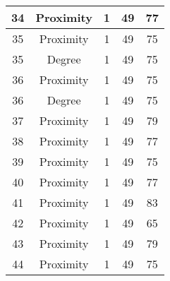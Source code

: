 \documentclass[results.tex]{subfiles}
\begin{document}
\begin{center}
\begin{tabular}{| c || c | c | c | c |}
            \hline
            34                      & Proximity                    & 1                      & 49                      & 77                   \\
            \hline
            35                      & Proximity                    & 1                      & 49                      & 75                   \\
            \hline
            35                      & Degree                       & 1                      & 49                      & 75                   \\
            \hline
            36                      & Proximity                    & 1                      & 49                      & 75                   \\
            \hline
            36                      & Degree                       & 1                      & 49                      & 75                   \\
            \hline
            37                      & Proximity                    & 1                      & 49                      & 79                   \\
            \hline
            38                      & Proximity                    & 1                      & 49                      & 77                   \\
            \hline
            39                      & Proximity                    & 1                      & 49                      & 75                   \\
            \hline
            40                      & Proximity                    & 1                      & 49                      & 77                   \\
            \hline
            41                      & Proximity                    & 1                      & 49                      & 83                   \\
            \hline
            42                      & Proximity                    & 1                      & 49                      & 65                   \\
            \hline
            43                      & Proximity                    & 1                      & 49                      & 79                   \\
            \hline
            44                      & Proximity                    & 1                      & 49                      & 75                   \\

\end{tabular}
\end{center}
\end{document}
